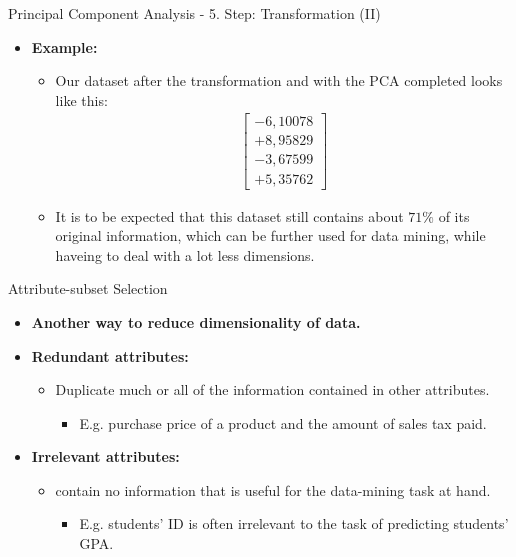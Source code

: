 \begin{frame}{Principal Component Analysis - 5. Step: Transformation (II)}
	\begin{itemize}
		\item \textbf{Example:}
		      \begin{itemize}
			      \item Our dataset after the transformation and with the PCA
			            completed looks like this: \\
			            \begin{align}
				            \begin{bmatrix} -6,10078 \\ +8,95829 \\ -3,67599 \\ +5,35762
				            \end{bmatrix}
			            \end{align}
			      \item It is to be expected that this dataset still contains about
			            $71\%$ of its original information, which can be further used for
			            data mining, while haveing to deal with a lot less dimensions.
		      \end{itemize}
	\end{itemize}
\end{frame}

\begin{frame}{Attribute-subset Selection}
	\begin{itemize}
		\item \textbf{Another way to reduce dimensionality of data.}
		      \item\textbf{\color{airforceblue}Redundant attributes:}
		      \begin{itemize}
			      \item Duplicate much or all of the information contained in other
			            attributes.
			            \begin{itemize}
				            \item E.g. purchase price of a product and the amount of sales
				                  tax paid.
			            \end{itemize}
		      \end{itemize}
		\item \textbf{\color{airforceblue}Irrelevant attributes:}
		      \begin{itemize}
			      \item contain no information that is useful for the data-mining
			            task at hand.
			            \begin{itemize}
				            \item E.g. students' ID is often irrelevant to the task of
				                  predicting students' GPA.
			            \end{itemize}
		      \end{itemize}
	\end{itemize}
\end{frame}

